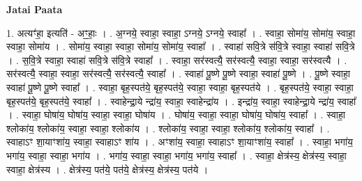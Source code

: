 \documentclass[17pt]{extarticle}
\begin{document}
\textbf{Jatai Paata} \newline

1. अत्यꣳ॑हा॒ इत्यति॑ - अꣳ॒॒हाः॒ । . अ॒ग्नये॒ स्वाहा॒ स्वाहा॒ ऽग्नये॒ ऽग्नये॒ स्वाहा᳚ । . स्वाहा॒ सोमा॑य॒ सोमा॑य॒ स्वाहा॒ स्वाहा॒ सोमा॑य । . सोमा॑य॒ स्वाहा॒ स्वाहा॒ सोमा॑य॒ सोमा॑य॒ स्वाहा᳚ । . स्वाहा॑ सवि॒त्रे स॑वि॒त्रे स्वाहा॒ स्वाहा॑ सवि॒त्रे । . स॒वि॒त्रे स्वाहा॒ स्वाहा॑ सवि॒त्रे स॑वि॒त्रे स्वाहा᳚ । . स्वाहा॒ सर॑स्वत्यै॒ सर॑स्वत्यै॒ स्वाहा॒ स्वाहा॒ सर॑स्वत्यै । . सर॑स्वत्यै॒ स्वाहा॒ स्वाहा॒ सर॑स्वत्यै॒ सर॑स्वत्यै॒ स्वाहा᳚ । . स्वाहा॑ पू॒ष्णे पू॒ष्णे स्वाहा॒ स्वाहा॑ पू॒ष्णे । . पू॒ष्णे स्वाहा॒ स्वाहा॑ पू॒ष्णे पू॒ष्णे स्वाहा᳚ । . स्वाहा॒ बृह॒स्पत॑ये॒ बृह॒स्पत॑ये॒ स्वाहा॒ स्वाहा॒ बृह॒स्पत॑ये । . बृह॒स्पत॑ये॒ स्वाहा॒ स्वाहा॒ बृह॒स्पत॑ये॒ बृह॒स्पत॑ये॒ स्वाहा᳚ । . स्वाहेन्द्रा॒ये न्द्रा॑य॒ स्वाहा॒ स्वाहेन्द्रा॑य । . इन्द्रा॑य॒ स्वाहा॒ स्वाहेन्द्रा॒ये न्द्रा॑य॒ स्वाहा᳚ । . स्वाहा॒ घोषा॑य॒ घोषा॑य॒ स्वाहा॒ स्वाहा॒ घोषा॑य । . घोषा॑य॒ स्वाहा॒ स्वाहा॒ घोषा॑य॒ घोषा॑य॒ स्वाहा᳚ । . स्वाहा॒ श्लोका॑य॒ श्लोका॑य॒ स्वाहा॒ स्वाहा॒ श्लोका॑य । . श्लोका॑य॒ स्वाहा॒ स्वाहा॒ श्लोका॑य॒ श्लोका॑य॒ स्वाहा᳚ । . स्वाहाऽꣳ शा॒याꣳशा॑य॒ स्वाहा॒ स्वाहाऽꣳ शा॑य । . अꣳशा॑य॒ स्वाहा॒ स्वाहाऽꣳ शा॒याꣳशा॑य॒ स्वाहा᳚ । . स्वाहा॒ भगा॑य॒ भगा॑य॒ स्वाहा॒ स्वाहा॒ भगा॑य । . भगा॑य॒ स्वाहा॒ स्वाहा॒ भगा॑य॒ भगा॑य॒ स्वाहा᳚ । . स्वाहा॒ क्षेत्र॑स्य॒ क्षेत्र॑स्य॒ स्वाहा॒ स्वाहा॒ क्षेत्र॑स्य । . क्षेत्र॑स्य॒ पत॑ये॒ पत॑ये॒ क्षेत्र॑स्य॒ क्षेत्र॑स्य॒ पत॑ये । \newline
\end{document}
